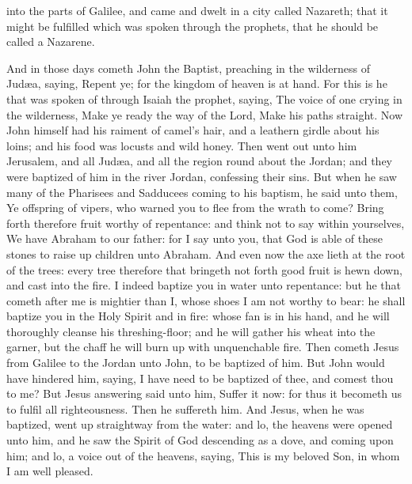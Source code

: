 into the parts of Galilee, and came and dwelt in a city called Nazareth; that it might be fulfilled which was spoken through the prophets, that he should be called a Nazarene. 

And in those days cometh John the Baptist, preaching in the wilderness of Judæa, saying, Repent ye; for the kingdom of heaven is at hand. For this is he that was spoken of through Isaiah the prophet, saying, The voice of one crying in the wilderness, Make ye ready the way of the Lord, Make his paths straight.  Now John himself had his raiment of camel’s hair, and a leathern girdle about his loins; and his food was locusts and wild honey. Then went out unto him Jerusalem, and all Judæa, and all the region round about the Jordan; and they were baptized of him in the river Jordan, confessing their sins. But when he saw many of the Pharisees and Sadducees coming to his baptism, he said unto them, Ye offspring of vipers, who warned you to flee from the wrath to come? Bring forth therefore fruit worthy of repentance: and think not to say within yourselves, We have Abraham to our father: for I say unto you, that God is able of these stones to raise up children unto Abraham. And even now the axe lieth at the root of the trees: every tree therefore that bringeth not forth good fruit is hewn down, and cast into the fire. I indeed baptize you in water unto repentance: but he that cometh after me is mightier than I, whose shoes I am not worthy to bear: he shall baptize you in the Holy Spirit and in fire: whose fan is in his hand, and he will thoroughly cleanse his threshing-floor; and he will gather his wheat into the garner, but the chaff he will burn up with unquenchable fire.  Then cometh Jesus from Galilee to the Jordan unto John, to be baptized of him. But John would have hindered him, saying, I have need to be baptized of thee, and comest thou to me? But Jesus answering said unto him, Suffer it now: for thus it becometh us to fulfil all righteousness. Then he suffereth him. And Jesus, when he was baptized, went up straightway from the water: and lo, the heavens were opened unto him, and he saw the Spirit of God descending as a dove, and coming upon him; and lo, a voice out of the heavens, saying, This is my beloved Son, in whom I am well pleased. 

